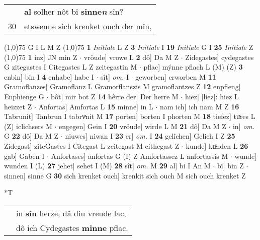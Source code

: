 \documentclass[8pt,a4paper,notitlepage]{article}
\begin{document}
\begin{table}[ht]
\begin{minipage}[t]{0.5\linewidth}
\begin{tabular}{rl}
 & \textbf{al} solher nôt bî \textbf{sinne\textit{n}} sîn?\\ 
30 & etswenne sich krenket ouch der mîn,\\ 
\end{tabular}
\scriptsize
\line(1,0){75} \newline
G I L M Z \newline
\line(1,0){75} \newline
\textbf{1} \textit{Initiale} L Z  \textbf{3} \textit{Initiale} I  \textbf{19} \textit{Initiale} G I  \textbf{25} \textit{Initiale} Z  \newline
\line(1,0){75} \newline
\textbf{1} inz] JN min Z  $\cdot$ vröude] vrowe L \textbf{2} dô] Da M Z  $\cdot$ Zidegastes] cydegastes G zitegastes I Citegastes L Z zcitegastin M  $\cdot$ pflac] mýnne pflach L (M) (Z) \textbf{3} enbin] bin I \textbf{4} enhabe] habe I  $\cdot$ sît] \textit{om.} I  $\cdot$ geworben] erworben M \textbf{11} Gramoflanzes] Gramoflanz L Gramorflanszis M gramoflantzes Z \textbf{12} enpfieng] Enphienge G  $\cdot$ bôt] mir bot Z \textbf{14} hêrre der] Der herre M  $\cdot$ hiez] [liez]: hiez L heizzet Z  $\cdot$ Anfortas] Amfortas L \textbf{15} minne] in L  $\cdot$ nam ich] ich nam M Z \textbf{16} Tabrunit] Tanbrun I tabrvͯnit M \textbf{17} porten] borten I phorten M \textbf{18} tiefez] tuͯres L (Z) iclichsers M  $\cdot$ engegen] Gein I \textbf{20} vröude] wirde L M \textbf{21} dô] Da M Z  $\cdot$ in] \textit{om.} G \textbf{22} dô] Da M Z  $\cdot$ niuwes] niwan I \textbf{23} er] \textit{om.} I \textbf{24} gelîchen] Gelich I Z \textbf{25} Zidegast] ziteGastes I Citegast L zcitegast M cithegast Z  $\cdot$ kunde] kuͯnden L \textbf{26} gab] Gaben I  $\cdot$ Anfortases] anfortas G (I) Z Amfortassez L anfortassis M  $\cdot$ wunde] wunden I (L) \textbf{27} jehet] sehet I (M) \textbf{28} sît] \textit{om.} M \textbf{29} al] bi I An M  $\cdot$ bî] bin Z  $\cdot$ sinnen] sinne G \textbf{30} sich krenket ouch] krenkit sich ouch M sich ouch krenket Z \newline
\end{minipage}
\hspace{0.5cm}
\begin{minipage}[t]{0.5\linewidth}
\small
\begin{center}*T
\end{center}
\begin{tabular}{rl}
 & in \textbf{sîn} herze, dâ diu vreude lac,\\ 
 & dô ich Cydegastes \textbf{minne} pflac.\\ 

\end{tabular}
\end{minipage}
\end{table}
\end{document}
